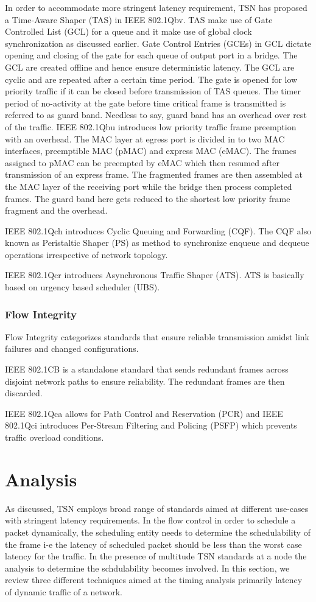 \documentclass[journal,12pt,twocolumn]{IEEEtran}
\begin{document}
In order to accommodate more stringent latency requirement, TSN has proposed a Time-Aware Shaper (TAS) in IEEE 802.1Qbv. TAS make use of Gate Controlled List (GCL) for a queue and it make use of global clock synchronization as discussed earlier. Gate Control Entries (GCEs) in GCL dictate opening and closing of the gate for each queue of output port in a bridge. The GCL are created offline and hence ensure deterministic latency. The GCL are cyclic and are repeated after a certain time period. The gate is opened for low priority traffic if it can be closed before transmission of TAS queues. The timer period of no-activity at the gate before time critical frame is transmitted is referred to as guard band. Needless to say, guard band has an overhead over rest of the traffic.
IEEE 802.1Qbu introduces low priority traffic frame preemption with an overhead. The MAC layer at egress port is divided in to two MAC interfaces, preemptible MAC (pMAC) and express MAC (eMAC). The frames assigned to pMAC can be preempted by eMAC which then resumed after transmission of an express frame. The fragmented frames are then assembled at the MAC layer of the receiving port while the bridge then process completed frames. The guard band here gets reduced to the shortest low priority frame fragment and the overhead.

IEEE 802.1Qch introduces Cyclic Queuing and Forwarding (CQF). The CQF also known as Peristaltic Shaper (PS) as method to synchronize enqueue and dequeue operations irrespective of network topology. 

IEEE 802.1Qcr introduces Asynchronous Traffic Shaper (ATS). ATS is basically based on urgency based scheduler (UBS).
\subsubsection{Flow Integrity}
Flow Integrity categorizes standards that ensure reliable transmission amidst link failures and changed configurations.

IEEE 802.1CB is a standalone standard that sends redundant frames across disjoint network paths to ensure reliability. The redundant frames are then discarded.

IEEE 802.1Qca allows for Path Control and Reservation (PCR) and IEEE 802.1Qci introduces Per-Stream Filtering and Policing (PSFP) which prevents traffic overload conditions.

\section {Analysis}
As discussed, TSN employs broad range of standards aimed at different use-cases with stringent latency requirements. In the flow control in order to schedule a packet dynamically, the scheduling entity needs to determine the schedulability of the frame i-e the latency of scheduled packet should be less than the worst case latency for the traffic. In the presence of multitude TSN standards at a node the analysis to determine the schdulability becomes involved. In this section, we review three different techniques aimed at the timing analysis primarily latency of dynamic traffic of a network.
\end{document}
